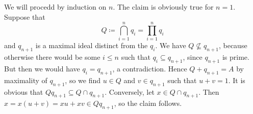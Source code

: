 We will procedd by induction on $n$. The claim is obviously true for $n = 1$.
Suppose that
\[ Q\coloneqq \bigcap_{i = 1}^n q_i = \prod_{i = 1}^n q_i \]
and $q_{n+1}$ is a maximal ideal distinct from the $q_i$. We have $Q \nsubseteq q_{n+1}$,
because otherwise there would be some $i \leq n$ such that $q_i \subseteq q_{n+1}$,
since $q_{n + 1}$ is prime. But then we would have $q_i = q_{n+1}$, a contradiction.
Hence $Q + q_{n+1} = A$ by maximality of $q_{n+1}$, so we find $u \in Q$ and
$v \in q_{n+1}$ such that $u + v = 1$. It is obvious that
$Qq_{n+1} \subseteq Q\cap q_{n+1}$. Conversely, let $x \in Q\cap q_{n+1}$. Then
$x = x(u + v) = xu + xv \in Qq_{n+1}$, so the claim follows.
